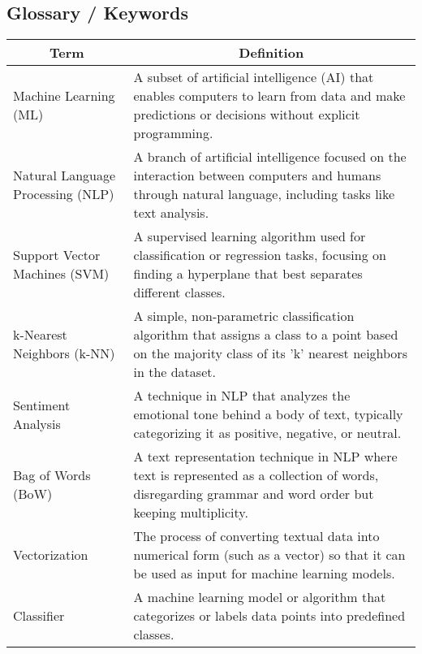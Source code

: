 \subsection{Glossary / Keywords}
\noindent

\begin{center}

\begin{tabular}{|p{4cm}|p{10cm}|}
  \hline
  \multicolumn{1}{|c|}{\textbf{Term}} & \multicolumn{1}{c|}{\textbf{Definition}} \\
  
  \hline
  Machine Learning (ML) & A subset of artificial intelligence (AI) that enables computers to learn from data and make predictions or decisions without explicit programming. \\

  \hline 
  Natural Language Processing (NLP) & A branch of artificial intelligence focused on the interaction between computers and humans through natural language, including tasks like text analysis. \\

  \hline 
  Support Vector Machines (SVM) & A supervised learning algorithm used for classification or regression tasks, focusing on finding a hyperplane that best separates different classes. \\

  \hline 
  k-Nearest Neighbors (k-NN) & A simple, non-parametric classification algorithm that assigns a class to a point based on the majority class of its 'k' nearest neighbors in the dataset. \\

  \hline 
  Sentiment Analysis & A technique in NLP that analyzes the emotional tone behind a body of text, typically categorizing it as positive, negative, or neutral. \\

  \hline 
  Bag of Words (BoW) & A text representation technique in NLP where text is represented as a collection of words, disregarding grammar and word order but keeping multiplicity. \\

  \hline 
  Vectorization & The process of converting textual data into numerical form (such as a vector) so that it can be used as input for machine learning models. \\

  \hline 
  Classifier & A machine learning model or algorithm that categorizes or labels data points into predefined classes. \\


\end{tabular}
\end{center}
